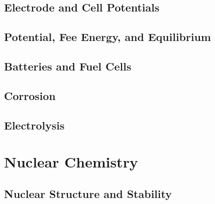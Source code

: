 \documentclass[12pt, openany, letterpaper]{memoir}
\begin{document}
\section{Electrode and Cell Potentials}

\section{Potential, Fee Energy, and Equilibrium}

\section{Batteries and Fuel Cells}

\section{Corrosion}

\section{Electrolysis}

\setcounter{chapter}{20}
\chapter{Nuclear Chemistry}

\section{Nuclear Structure and Stability}
\end{document}

